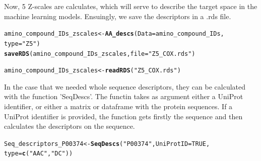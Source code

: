 \documentclass[twoside,a4wide,12pt]{article}\usepackage[]{graphicx}\usepackage[]{color}
\makeatletter
\newcommand{\hlnum}[1]{\textcolor[rgb]{0.686,0.059,0.569}{#1}}%
\newcommand{\hlstr}[1]{\textcolor[rgb]{0.192,0.494,0.8}{#1}}%
\newcommand{\hlstd}[1]{\textcolor[rgb]{0.345,0.345,0.345}{#1}}%
\newcommand{\hlkwb}[1]{\textcolor[rgb]{0.69,0.353,0.396}{#1}}%
\newcommand{\hlkwc}[1]{\textcolor[rgb]{0.333,0.667,0.333}{#1}}%
\newcommand{\hlkwd}[1]{\textcolor[rgb]{0.737,0.353,0.396}{\textbf{#1}}}%
\newenvironment{kframe}{%
 \def\at@end@of@kframe{}%
 \ifinner\ifhmode%
  \def\at@end@of@kframe{\end{minipage}}%
  \begin{minipage}{\columnwidth}%
 \fi\fi%
 \def\FrameCommand##1{\hskip\@totalleftmargin \hskip-\fboxsep
 \colorbox{shadecolor}{##1}\hskip-\fboxsep
     \hskip-\linewidth \hskip-\@totalleftmargin \hskip\columnwidth}%
 \MakeFramed {\advance\hsize-\width
   \@totalleftmargin\z@ \linewidth\hsize
   \@setminipage}}%
 {\par\unskip\endMakeFramed%
 \at@end@of@kframe}
\newenvironment{knitrout}{}{} %
\makeatother
\begin{document}
Now, 5 Z-scales are calculates, which will serve to describe the target space in the machine learning models.
Ensuingly, we save the descriptors in a .rds file.
\begin{knitrout}
\color{fgcolor}\begin{kframe}
\begin{alltt}
\hlstd{amino_compound_IDs_zscales} \hlkwb{<-} \hlkwd{AA_descs}\hlstd{(}\hlkwc{Data} \hlstd{= amino_compound_IDs,}
    \hlkwc{type} \hlstd{=} \hlstr{"Z5"}\hlstd{)}
\hlkwd{saveRDS}\hlstd{(amino_compound_IDs_zscales,} \hlkwc{file} \hlstd{=} \hlstr{"Z5_COX.rds"}\hlstd{)}
\end{alltt}
\end{kframe}
\end{knitrout}


\begin{knitrout}
\color{fgcolor}\begin{kframe}
\begin{alltt}
\hlstd{amino_compound_IDs_zscales} \hlkwb{<-} \hlkwd{readRDS}\hlstd{(}\hlstr{"Z5_COX.rds"}\hlstd{)}
\end{alltt}
\end{kframe}
\end{knitrout}


In the case that we needed whole sequence descriptors, they can be calculated with the function 'SeqDescs'. 
The functin takes as argument either a UniProt identifier, or either a matrix or dataframe with the protein sequences.
If a UniProt identifier is provided, the function gets firstly the sequence and then calculates the descriptors on the sequence.

\begin{knitrout}
\color{fgcolor}\begin{kframe}
\begin{alltt}
\hlstd{Seq_descriptors_P00374} \hlkwb{<-} \hlkwd{SeqDescs}\hlstd{(}\hlstr{"P00374"}\hlstd{,} \hlkwc{UniProtID} \hlstd{=} \hlnum{TRUE}\hlstd{,}
    \hlkwc{type} \hlstd{=} \hlkwd{c}\hlstd{(}\hlstr{"AAC"}\hlstd{,} \hlstr{"DC"}\hlstd{))}
\end{alltt}
\end{kframe}
\end{knitrout}
\end{document}
